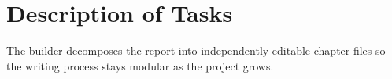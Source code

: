\section{Description of Tasks}
\label{sec:description-of-tasks}

The builder decomposes the report into independently editable chapter files so the writing process stays modular as the project grows.
